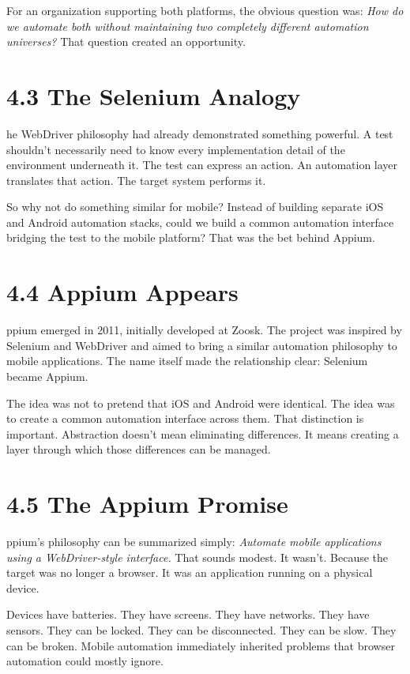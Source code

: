 \documentclass[11pt, a4paper, openany]{book}
\newcommand{\initialcap}[1]{{\fontfamily{lmss}\selectfont\huge\textbf{#1}}}
\begin{document}
For an organization supporting both platforms, the obvious question was: \textit{How do we automate both without maintaining two completely different automation universes?} That question created an opportunity.

\section{4.3 The Selenium Analogy}
\noindent \initialcap{T}he WebDriver philosophy had already demonstrated something powerful. A test shouldn't necessarily need to know every implementation detail of the environment underneath it. The test can express an action. An automation layer translates that action. The target system performs it. 

So why not do something similar for mobile? Instead of building separate iOS and Android automation stacks, could we build a common automation interface bridging the test to the mobile platform? That was the bet behind Appium.

\section{4.4 Appium Appears}
\noindent \initialcap{A}ppium emerged in 2011, initially developed at Zoosk. The project was inspired by Selenium and WebDriver and aimed to bring a similar automation philosophy to mobile applications. The name itself made the relationship clear: Selenium became Appium. 

The idea was not to pretend that iOS and Android were identical. The idea was to create a common automation interface across them. That distinction is important. Abstraction doesn't mean eliminating differences. It means creating a layer through which those differences can be managed.

\section{4.5 The Appium Promise}
\noindent \initialcap{A}ppium's philosophy can be summarized simply: \textit{Automate mobile applications using a WebDriver-style interface.} That sounds modest. It wasn't. Because the target was no longer a browser. It was an application running on a physical device. 

Devices have batteries. They have screens. They have networks. They have sensors. They can be locked. They can be disconnected. They can be slow. They can be broken. Mobile automation immediately inherited problems that browser automation could mostly ignore.
\end{document}
